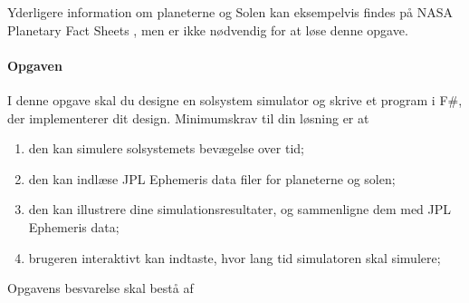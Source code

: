 \documentclass{article}
\begin{document}
\begin{enumerate}[label=11g.\arabic*,start=0]
Yderligere information om planeterne og Solen kan eksempelvis findes på NASA Planetary Fact Sheets \cite{NASA}, men er ikke nødvendig for at løse denne opgave.

\paragraph{Opgaven}
I denne opgave skal du designe en solsystem simulator og skrive et program i F\#, der implementerer dit design. Minimumskrav til din løsning er at
\begin{enumerate}
\item den kan simulere solsystemets bevægelse over tid;
\item den kan indlæse JPL Ephemeris data filer for planeterne og solen;
\item den kan illustrere dine simulationsresultater, og sammenligne dem med JPL Ephemeris data;
\item brugeren interaktivt kan indtaste, hvor lang tid simulatoren skal simulere;
\end{enumerate}     

\noindent Opgavens besvarelse skal bestå af


\end{enumerate}
\end{document}
